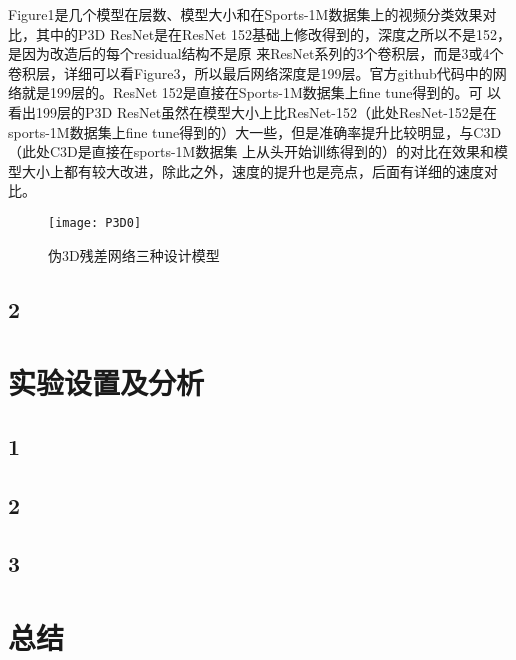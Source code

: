 Figure1是几个模型在层数、模型大小和在Sports-1M数据集上的视频分类效果对比，其中的P3D ResNet是在ResNet 152基础上修改得到的，深度之所以不是152，是因为改造后的每个residual结构不是原
来ResNet系列的3个卷积层，而是3或4个卷积层，详细可以看Figure3，所以最后网络深度是199层。官方github代码中的网络就是199层的。ResNet 152是直接在Sports-1M数据集上fine tune得到的。可
以看出199层的P3D ResNet虽然在模型大小上比ResNet-152（此处ResNet-152是在sports-1M数据集上fine tune得到的）大一些，但是准确率提升比较明显，与C3D（此处C3D是直接在sports-1M数据集
上从头开始训练得到的）的对比在效果和模型大小上都有较大改进，除此之外，速度的提升也是亮点，后面有详细的速度对比。

\begin{figure}[]
\centering
\texttt{[image: P3D0]}
\caption{伪3D残差网络三种设计模型}
\label{fig18}
\end{figure}

\subsection{2}



\section{实验设置及分析}

\subsection{1}

\subsection{2}

\subsection{3}

\section{总结}
